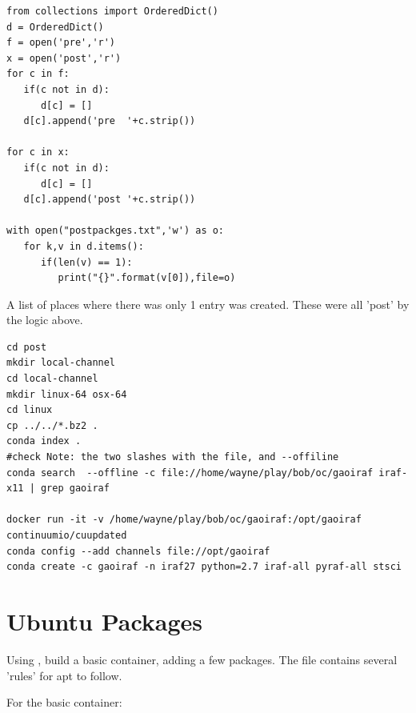 \documentclass[letter,11pt,oneside]{article}
\newcommand{\dhl}[1]{{\color{verbcolor}{\texttt#1}}}
\begin{document}
\begin{tcolorbox}
  \begingroup \fontsize{10pt}{10pt}
\selectfont
\begin{verbatim} 
from collections import OrderedDict()
d = OrderedDict()
f = open('pre','r')
x = open('post','r')
for c in f:
   if(c not in d):
      d[c] = []
   d[c].append('pre  '+c.strip())

for c in x:
   if(c not in d):
      d[c] = []
   d[c].append('post '+c.strip())

with open("postpackges.txt",'w') as o:
   for k,v in d.items():
      if(len(v) == 1):
         print("{}".format(v[0]),file=o)
\end{verbatim}
\endgroup
\end{tcolorbox}

A list of places where there was only 1 entry was
created. These were all 'post' by the logic above.

\begin{tcolorbox}
  \begingroup \fontsize{10pt}{10pt}
\selectfont
\begin{verbatim} 
cd post
mkdir local-channel
cd local-channel
mkdir linux-64 osx-64
cd linux
cp ../../*.bz2 .
conda index .
#check Note: the two slashes with the file, and --offiline
conda search  --offline -c file://home/wayne/play/bob/oc/gaoiraf iraf-x11 | grep gaoiraf

docker run -it -v /home/wayne/play/bob/oc/gaoiraf:/opt/gaoiraf continuumio/cuupdated
conda config --add channels file://opt/gaoiraf
conda create -c gaoiraf -n iraf27 python=2.7 iraf-all pyraf-all stsci
\end{verbatim}
\endgroup
\end{tcolorbox}

\section{Ubuntu Packages}

Using \dhl{docker pull ubuntu18.04:latest}, build a basic container,
adding a few packages. The file \dhl{/etc/apt/apt.conf.d} contains
several 'rules' for apt to follow.

For the basic container:
\end{document}
